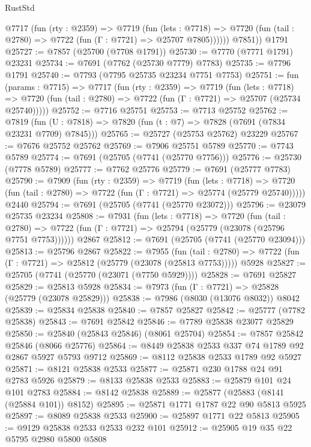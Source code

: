 \begin{lexlean}{RustStd}
\begin{coremodule}
          @7717
            (fun (rty : @2359) =>
            @7719
              (fun (lets : @7718) =>
              @7720 (fun (tail : @2780) => @7722 (fun (Γ : @7721) => @25707 @7805))))))
        @7851))
    @1791
@25727 := @7857 (@25700 (@7708 @1791))
@25730 := @7770 (@7771 @1791) @23231
@25734 := @7691 (@7762 (@25730 @7779) @7783)
@25735 := @7796 @1791
@25740 := @7793 (@7795 @25735 @23234 @7751 @7753)
@25751 := fun (params : @7715) =>
  @7717
    (fun (rty : @2359) =>
    @7719
      (fun (lets : @7718) =>
      @7720 (fun (tail : @2780) => @7722 (fun (Γ : @7721) => @25707 (@25734 @25740)))))
@25752 := @7716 @25751
@25753 := @7713 @25752
@25762 := @7819
    (fun (U : @7818) => @7820 (fun (t : @7) => @7828 (@7691 (@7834 @23231 @7709) @7845)))
@25765 := @25727 (@25753 @25762) @23229
@25767 := @7676 @25752 @25762
@25769 := @7906 @25751 @5789
@25770 := @7743 @5789
@25774 := @7691 (@25705 (@7741 (@25770 @7756)))
@25776 := @25730 (@7778 @5789)
@25777 := @7762 @25776
@25779 := @7691 (@25777 @7783)
@25790 := @7909
    (fun (rty : @2359) =>
    @7719
      (fun (lets : @7718) =>
      @7720 (fun (tail : @2780) => @7722 (fun (Γ : @7721) => @25774 (@25779 @25740)))))
    @2440
@25794 := @7691 (@25705 (@7741 (@25770 @23072)))
@25796 := @23079 @25735 @23234
@25808 := @7931
    (fun (lets : @7718) =>
    @7720
      (fun (tail : @2780) =>
      @7722 (fun (Γ : @7721) => @25794 (@25779 (@23078 (@25796 @7751 @7753))))))
    @2867
@25812 := @7691 (@25705 (@7741 (@25770 @23094)))
@25813 := @25796 @2867
@25822 := @7955
    (fun (tail : @2780) => @7722 (fun (Γ : @7721) => @25812 (@25779 (@23078 (@25813 @7753)))))
    @5928
@25827 := @25705 (@7741 (@25770 (@23071 (@7750 @5929))))
@25828 := @7691 @25827
@25829 := @25813 @5928
@25834 := @7973 (fun (Γ : @7721) => @25828 (@25779 (@23078 @25829)))
@25838 := @7986 (@8030 (@13076 @8032)) @8042
@25839 := @25834 @25838
@25840 := @7857 @25827
@25842 := @25777 (@7782 @25838)
@25843 := @7691 @25842
@25846 := @7789 @25838 @23077 @25829
@25850 := @25840 (@25843 @25846) (@8061 @25704)
@25854 := @7857 @25842 @25846 (@8066 @25776)
@25864 := @8449 @25838 @2533 @337 @74 @1789 @92 @2867 @5927 @5793 @9712
@25869 := @8112 @25838 @2533 @1789 @92 @5927
@25871 := @8121 @25838 @2533
@25877 := @25871 @230 @1788 @24 @91 @2783 @5926
@25879 := @8133 @25838 @2533
@25883 := @25879 @101 @24 @101 @2783
@25884 := @8142 @25838
@25889 := @25877 (@25883 (@8141 (@25884 @101)) @8152)
@25895 := @25871 @1771 @1787 @22 @90 @5813 @5925
@25897 := @8089 @25838 @2533
@25900 := @25897 @1771 @22 @5813
@25905 := @9129 @25838 @2533 @2533 @232 @101
@25912 := @25905 @19 @35 @22 @5795 @2980 @5800 @5808

\end{coremodule}
\end{lexlean}
